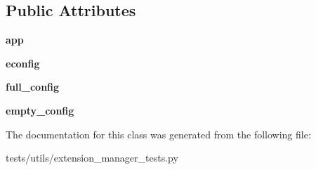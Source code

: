 \subsection*{Public Attributes}
\begin{DoxyCompactItemize}
\item 
\hypertarget{classtests_1_1utils_1_1extension__manager__tests_1_1ConfigManagerTests_af67e4d12f4575bda0b3d25dda63e2ea5}{{\bfseries app}}\label{classtests_1_1utils_1_1extension__manager__tests_1_1ConfigManagerTests_af67e4d12f4575bda0b3d25dda63e2ea5}

\item 
\hypertarget{classtests_1_1utils_1_1extension__manager__tests_1_1ConfigManagerTests_aae5dc5cd86e14b07f1d8b3713d5fa8f4}{{\bfseries econfig}}\label{classtests_1_1utils_1_1extension__manager__tests_1_1ConfigManagerTests_aae5dc5cd86e14b07f1d8b3713d5fa8f4}

\item 
\hypertarget{classtests_1_1utils_1_1extension__manager__tests_1_1ConfigManagerTests_ab5f46c854c44437f5150817e006559d7}{{\bfseries full\-\_\-config}}\label{classtests_1_1utils_1_1extension__manager__tests_1_1ConfigManagerTests_ab5f46c854c44437f5150817e006559d7}

\item 
\hypertarget{classtests_1_1utils_1_1extension__manager__tests_1_1ConfigManagerTests_a0f46e46f16faf60274370dde12326477}{{\bfseries empty\-\_\-config}}\label{classtests_1_1utils_1_1extension__manager__tests_1_1ConfigManagerTests_a0f46e46f16faf60274370dde12326477}

\end{DoxyCompactItemize}


The documentation for this class was generated from the following file\-:\begin{DoxyCompactItemize}
\item 
tests/utils/extension\-\_\-manager\-\_\-tests.\-py\end{DoxyCompactItemize}
